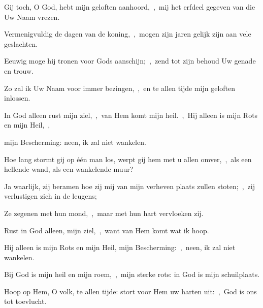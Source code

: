 \documentclass[12pt,twoside,a5paper]{article}
\begin{document}

\begin{halfparskip}
  Gij toch, O God, hebt mijn geloften aanhoord,~\sep\ mij het erfdeel gegeven van die Uw Naam vrezen.

  Vermenigvuldig de dagen van de koning,~\sep\ mogen zijn jaren gelijk zijn aan vele geslachten.

  Eeuwig moge hij tronen voor Gods aanschijn;~\sep\ zend tot zijn behoud Uw genade en trouw.

  Zo zal ik Uw Naam voor immer bezingen,~\sep\ en te allen tijde mijn geloften inlossen.
\end{halfparskip}





\begin{halfparskip}
  In God alleen rust mijn ziel,~\sep\ van Hem komt mijn heil.~\sep\ Hij alleen is mijn Rots en mijn Heil,~\sep


  mijn Bescherming: neen, ik zal niet wankelen.

  Hoe lang stormt gij op één man los, werpt gij hem met u allen omver,~\sep\ als een hellende wand, als een wankelende muur?

  Ja waarlijk, zij beramen hoe zij mij van mijn verheven plaats zullen stoten;~\sep\ zij verlustigen zich in de leugens;

  Ze zegenen met hun mond,~\sep\ maar met hun hart vervloeken zij.

  Rust in God alleen, mijn ziel,~\sep\ want van Hem komt wat ik hoop.

  Hij alleen is mijn Rots en mijn Heil, mijn Bescherming:~\sep\ neen, ik zal niet wankelen.

  Bij God is mijn heil en mijn roem,~\sep\ mijn sterke rots: in God is mijn schuilplaats.

  Hoop op Hem, O volk, te allen tijde: stort voor Hem uw harten uit:~\sep\ God is ons tot toevlucht.
\end{halfparskip}
\end{document}
